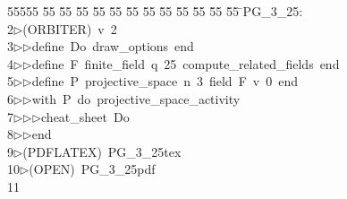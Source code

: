 %
%
\begin{tabbing}
55555 \= 55 \= 55 \= 55 \= 55 \= 55 \= 55 \= 55 \= 55 \= 55 \= 55 \= 55 \= 55 \= \>PG\_3\_25:\\[0pt]
2\>$\triangleright$\>(ORBITER)\ v\ 2\ \\[0pt]
3\>$\triangleright$\>$\triangleright$\>define\ Do\ draw\_options\ end\ \\[0pt]
4\>$\triangleright$\>$\triangleright$\>define\ F\ finite\_field\ q\ 25\ compute\_related\_fields\ end\ \\[0pt]
5\>$\triangleright$\>$\triangleright$\>define\ P\ projective\_space\ n\ 3\ field\ F\ v\ 0\ end\ \\[0pt]
6\>$\triangleright$\>$\triangleright$\>with\ P\ do\ projective\_space\_activity\ \\[0pt]
7\>$\triangleright$\>$\triangleright$\>$\triangleright$\>cheat\_sheet\ Do\ \\[0pt]
8\>$\triangleright$\>$\triangleright$\>end\\[0pt]
9\>$\triangleright$\>(PDFLATEX)\ PG\_3\_25tex\ \\[0pt]
10\>$\triangleright$\>(OPEN)\ PG\_3\_25pdf\\[0pt]
11\>\end{tabbing}
